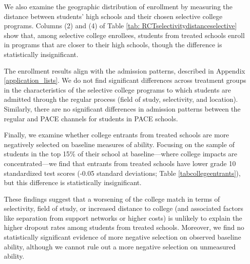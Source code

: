 We also examine the geographic distribution of enrollment by measuring the distance between students' high schools and their chosen selective college programs. Columns (2) and (4) of Table \ref{tab: RCTselectivitydistanceselective} show that, among selective college enrollees, students from treated schools enroll in programs that are closer to their high schools, though the difference is statistically insignificant. \par 



 The enrollment results align with the admission patterns, described in Appendix \ref{application_lists}. We do not find significant differences across treatment groups in the characteristics of the selective college programs to which students are admitted through the regular process (field of study, selectivity, and location). Similarly, there are no significant differences in admission patterns between the regular and PACE channels for students in PACE schools.\par 

 Finally, we examine whether college entrants from treated schools are more negatively selected on baseline measures of ability. Focusing on the sample of students in the top 15\% of their school at baseline---where college impacts are concentrated---we find that entrants from treated schools have lower grade 10 standardized test scores (-0.05 standard deviations; Table \ref{tabcollegeentrants}), but this difference is statistically insignificant. \par 

 These findings suggest that a worsening of the college match in terms of selectivity, field of study, or increased distance to college (and associated factors like separation from support networks or higher costs) is unlikely to explain the higher dropout rates among students from treated schools. Moreover, we find no statistically significant evidence of more negative selection on observed baseline ability, although we cannot rule out a more negative selection on unmeasured ability.





